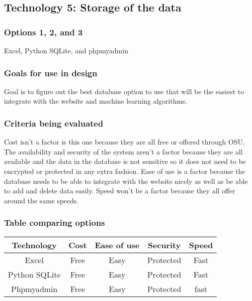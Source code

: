 \documentclass[journal,onecolumn]{IEEEtran}
\begin{document}
\subsection{Technology 5: Storage of the data}

\subsubsection{Options 1, 2, and 3}
Excel, Python SQLite, and phpmyadmin
\subsubsection{Goals for use in design}
Goal is to figure out the best database option to use that will be the easiest to integrate with the website and machine learning algorithms.

\subsubsection{Criteria being evaluated}
Cost isn’t a factor is this one because they are all free or offered through OSU. The availability and security of the system aren’t a factor because they are all available and the data in the database is not sensitive so it does not need to be encrypted or protected in any extra fashion. Ease of use is a factor because the database needs to be able to integrate with the website nicely as well as be able to add and delete data easily. Speed won’t be a factor because they all offer around the same speeds.

\subsubsection{Table comparing options}



\begin{center}
 \begin{tabular}{||c | c | c | c | c||} 
 \hline
 Technology & Cost & Ease of use & Security & Speed \\ [0.5ex] 
 \hline\hline
 Excel & Free & Easy & Protected & Fast \\ 
 \hline
 Python SQLite & Free & Easy & Protected & Fast \\
 \hline
 Phpmyadmin & Free & Easy & Protected & fast \\ [1ex]
 \hline
\end{tabular}
\end{center}
\end{document}

